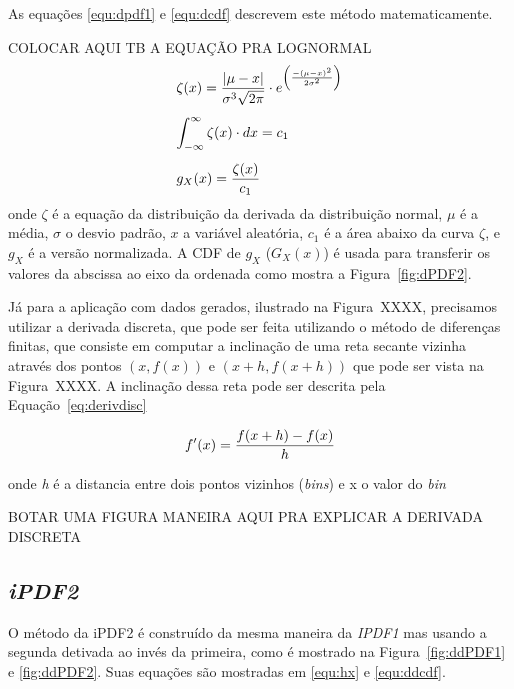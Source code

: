 As equações \eqref{equ:dpdf1} e \eqref{equ:dcdf} descrevem este método matematicamente.

\color{red} COLOCAR AQUI TB A EQUAÇÃO PRA LOGNORMAL \color{black}
\begin{equation}
\begin{array}{l}
\vspace{0.3cm}\displaystyle \zeta(x) = \frac{|\mu-x|}{\sigma^3\sqrt{2\pi}}\cdot e^{\left(\frac{-(\mu-x)^2}{2\sigma^2}\right) } \\
\vspace{0.3cm} \displaystyle \int_{-\infty}^{\infty} \zeta(x)\cdot dx = c_1 \\
\displaystyle g_X(x) = \frac{\zeta(x)}{c_1}
\label{equ:dpdf1}
\end{array}
\end{equation}
onde $\zeta$ é a equação da distribuição da derivada da distribuição normal, $\mu$ é a média, $\sigma$ o desvio padrão, $x$ a variável aleatória, $c_1$ é a área abaixo da curva $\zeta$, e $g_X$ é a versão normalizada.	
A \ac{CDF} de $g_X$ ($G_X(x)$) é usada para transferir os valores da abscissa ao eixo da ordenada como mostra a  Figura~\ref{fig:dPDF2}.




Já para a aplicação com dados gerados, ilustrado na Figura~XXXX, precisamos utilizar a derivada discreta, que pode ser feita utilizando o método de diferenças finitas, que consiste em computar a inclinação de uma reta secante vizinha através dos pontos $(x,f(x))$ e $(x+h,f(x+h))$ \cite{burden2001numerical} que pode ser vista na Figura~XXXX. A inclinação dessa reta pode ser descrita pela Equação~\eqref{eq:derivdisc}

\begin{equation}
	{\displaystyle f'(x) = {f(x+h)-f(x) \over h}}
	\label{eq:derivdisc}
\end{equation}

onde \textit{h} é a distancia entre dois pontos vizinhos (\textit{bins}) e x o valor do \textit{bin}

{\color{red} BOTAR UMA FIGURA MANEIRA AQUI PRA EXPLICAR A DERIVADA DISCRETA}




\subsection{\textit{iPDF2}} \label{cap:ipdf2}
O método da \ac{iPDF2} é construído da mesma maneira da \textit{IPDF1} mas usando a segunda detivada ao invés da primeira, como é mostrado na Figura~\ref{fig:ddPDF1} e \ref{fig:ddPDF2}. Suas equações são mostradas em \eqref{equ:hx} e \eqref{equ:ddcdf}.

